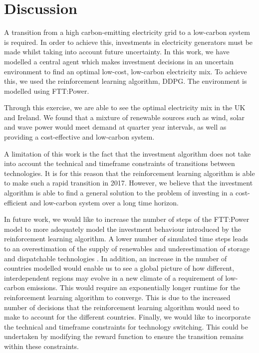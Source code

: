 

\section{Discussion}

A transition from a high carbon-emitting electricity grid to a low-carbon system is required. In order to achieve this, investments in electricity generators must be made whilst taking into account future uncertainty. In this work, we have modelled a central agent which makes investment decisions in an uncertain environment to find an optimal low-cost, low-carbon electricity mix. To achieve this, we used the reinforcement learning algorithm, DDPG. The environment is modelled using FTT:Power.

Through this exercise, we are able to see the optimal electricity mix in the UK and Ireland. We found that a mixture of renewable sources such as wind, solar and wave power would meet demand at quarter year intervals, as well as providing a cost-effective and low-carbon system.

A limitation of this work is the fact that the investment algorithm does not take into account the technical and timeframe constraints of transitions between technologies. It is for this reason that the reinforcement learning algorithm is able to make such a rapid transition in 2017. However, we believe that the investment algorithm is able to find a general solution to the problem of investing in a cost-efficient and low-carbon system over a long time horizon.

In future work, we would like to increase the number of steps of the FTT:Power model to more adequately model the investment behaviour introduced by the reinforcement learning algorithm. A lower number of simulated time steps leads to an overestimation of the supply of renewables and underestimation of storage and dispatchable technologies \cite{Ludig2011}. In addition, an increase in the number of countries modelled would enable us to see a global picture of how different, interdependent regions may evolve in a new climate of a requirement of low-carbon emissions. This would require an exponentially longer runtime for the reinforcement learning algorithm to converge. This is due to the increased number of decisions that the reinforcement learning algorithm would need to make to account for the different countries. Finally, we would like to incorporate the technical and timeframe constraints for technology switching. This could be undertaken by modifying the reward function to ensure the transition remains within these constraints.

